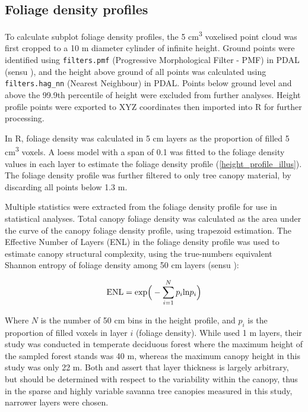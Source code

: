 \documentclass[11pt,a4paper]{article}
\begin{document}
\subsection{Foliage density profiles}

To calculate subplot foliage density profiles, the 5 cm\textsuperscript{3} voxelised point cloud was first cropped to a 10 m diameter cylinder of infinite height. Ground points were identified using \texttt{filters.pmf} (Progressive Morphological Filter - PMF) in PDAL (sensu \citealt{Zhang2003}), and the height above ground of all points was calculated using \texttt{filters.hag\_nn} (Nearest Neighbour) in PDAL. Points below ground level and above the 99.9th percentile of height were excluded from further analyses. Height profile points were exported to XYZ coordinates then imported into R for further processing. 

In R, foliage density was calculated in 5 cm layers as the proportion of filled 5 cm\textsuperscript{3} voxels. A loess model with a span of 0.1 was fitted to the foliage density values in each layer to estimate the foliage density profile (\autoref{height_profile_illus}). The foliage density profile was further filtered to only tree canopy material, by discarding all points below 1.3 m.

Multiple statistics were extracted from the foliage density profile for use in statistical analyses. Total canopy foliage density was calculated as the area under the curve of the canopy foliage density profile, using trapezoid estimation. The Effective Number of Layers (ENL) in the foliage density profile was used to estimate canopy structural complexity, using the true-numbers equivalent Shannon entropy of foliage density among 50 cm layers (sensu \citealt{Ehbrecht2016}):

\begin{equation}
	\text{ENL} = \text{exp}\Big{(} - \sum_{i=1}^{N} p_{i} \text{ln} p_{i} \Big{)}
\end{equation}

Where $N$ is the number of 50 cm bins in the height profile, and $p_{i}$ is the proportion of filled voxels in layer $i$ (foliage density). While \citet{Ehbrecht2016} used 1 m layers, their study was conducted in temperate deciduous forest where the maximum height of the sampled forest stands was 40 m, whereas the maximum canopy height in this study was only 22 m. Both \citet{Ehbrecht2016} and \citet{Montes2004} assert that layer thickness is largely arbitrary, but should be determined with respect to the variability within the canopy, thus in the sparse and highly variable savanna tree canopies measured in this study, narrower layers were chosen. 
\end{document}
